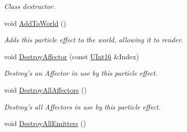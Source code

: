 \begin{DoxyCompactItemize}
\begin{DoxyCompactList}\small\item\em Class destructor. \item\end{DoxyCompactList}\item 
void \hyperlink{classMezzanine_1_1ParticleEffect_a404d1a6fa07ea2fc5937854ea05702f0}{AddToWorld} ()
\begin{DoxyCompactList}\small\item\em Adds this particle effect to the world, allowing it to render. \item\end{DoxyCompactList}\item 
void \hyperlink{classMezzanine_1_1ParticleEffect_a17d3cf19370d74b724fcbb737c8ff30e}{DestroyAffector} (const \hyperlink{namespaceMezzanine_a1b6c09063432c7ddd87011c88306c767}{UInt16} \&Index)
\begin{DoxyCompactList}\small\item\em Destroy's an Affector in use by this particle effect. \item\end{DoxyCompactList}\item 
\hypertarget{classMezzanine_1_1ParticleEffect_a11b8d00124844fc531ca4018b0b5d49f}{
void \hyperlink{classMezzanine_1_1ParticleEffect_a11b8d00124844fc531ca4018b0b5d49f}{DestroyAllAffectors} ()}
\label{classMezzanine_1_1ParticleEffect_a11b8d00124844fc531ca4018b0b5d49f}

\begin{DoxyCompactList}\small\item\em Destroy's all Affectors in use by this particle effect. \item\end{DoxyCompactList}\item 
\hypertarget{classMezzanine_1_1ParticleEffect_aa94e64c4b3355cd470c362ea24b907e7}{
void \hyperlink{classMezzanine_1_1ParticleEffect_aa94e64c4b3355cd470c362ea24b907e7}{DestroyAllEmitters} ()}
\label{classMezzanine_1_1ParticleEffect_aa94e64c4b3355cd470c362ea24b907e7}


\end{DoxyCompactItemize}
